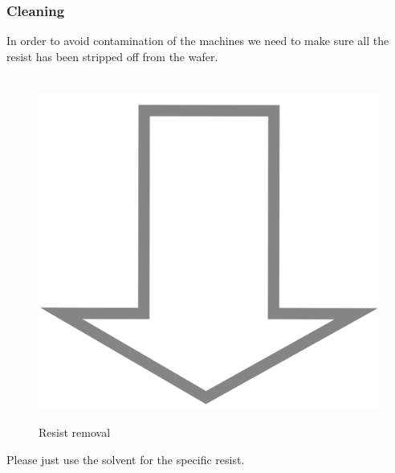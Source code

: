 \subsubsection{Cleaning}
In order to avoid contamination of the machines we need to make sure all the resist has been stripped off from the wafer.
\begin{figure}[H]
	\centering
	\begin{tikzpicture}[node distance = 3cm, auto, thick,scale=\CrossSectionOnly, every node/.style={transform shape}]
		
	\end{tikzpicture} \\
	\includegraphics[scale=0.01]{down_arrow.png} \\
	\begin{tikzpicture}[node distance = 3cm, auto, thick,scale=\CrossSectionOnly, every node/.style={transform shape}]
		
	\end{tikzpicture}
	\caption{Resist removal}
\end{figure}
Please just use the solvent for the specific resist.

